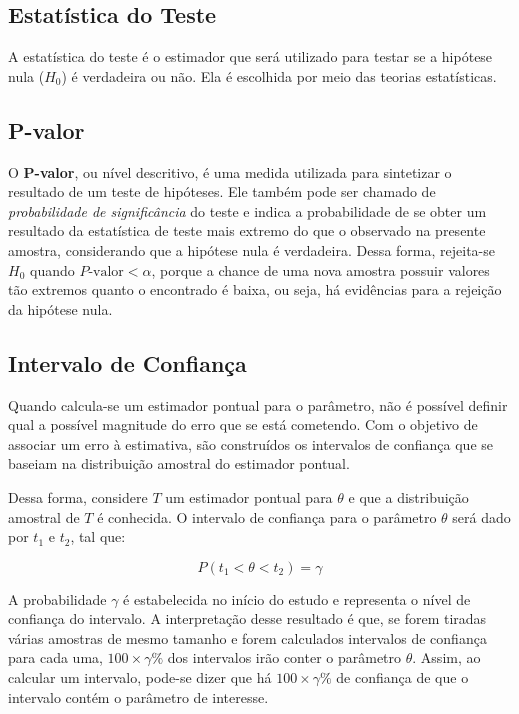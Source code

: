 \documentclass[
]{estat/estat}
\begin{document}
\hypertarget{estatuxedstica-do-teste}{%
\subsection{Estatística do Teste}\label{estatuxedstica-do-teste}}

A estatística do teste é o estimador que será utilizado para testar se a
hipótese nula (\(H_{0}\)) é verdadeira ou não. Ela é escolhida por meio
das teorias estatísticas.

\hypertarget{p-valor}{%
\subsection{P-valor}\label{p-valor}}

O \textbf{P-valor}, ou nível descritivo, é uma medida utilizada para
sintetizar o resultado de um teste de hipóteses. Ele também pode ser
chamado de \emph{probabilidade de significância} do teste e indica a
probabilidade de se obter um resultado da estatística de teste mais
extremo do que o observado na presente amostra, considerando que a
hipótese nula é verdadeira. Dessa forma, rejeita-se \(H_{0}\) quando
\(P\text{-valor} < \alpha\), porque a chance de uma nova amostra possuir
valores tão extremos quanto o encontrado é baixa, ou seja, há evidências
para a rejeição da hipótese nula.

\hypertarget{intervalo-de-confianuxe7a}{%
\subsection{Intervalo de Confiança}\label{intervalo-de-confianuxe7a}}

Quando calcula-se um estimador pontual para o parâmetro, não é possível
definir qual a possível magnitude do erro que se está cometendo. Com o
objetivo de associar um erro à estimativa, são construídos os intervalos
de confiança que se baseiam na distribuição amostral do estimador
pontual.

Dessa forma, considere \(T\) um estimador pontual para \(\theta\) e que
a distribuição amostral de \(T\) é conhecida. O intervalo de confiança
para o parâmetro \(\theta\) será dado por \(t_{1}\) e \(t_{2}\), tal
que:

\[ P(t_{1} < \theta < t_{2}) = \gamma \]

A probabilidade \(\gamma\) é estabelecida no início do estudo e
representa o nível de confiança do intervalo. A interpretação desse
resultado é que, se forem tiradas várias amostras de mesmo tamanho e
forem calculados intervalos de confiança para cada uma,
\(100 \times \gamma \%\) dos intervalos irão conter o parâmetro
\(\theta\). Assim, ao calcular um intervalo, pode-se dizer que há
\(100 \times \gamma \%\) de confiança de que o intervalo contém o
parâmetro de interesse.
\end{document}
